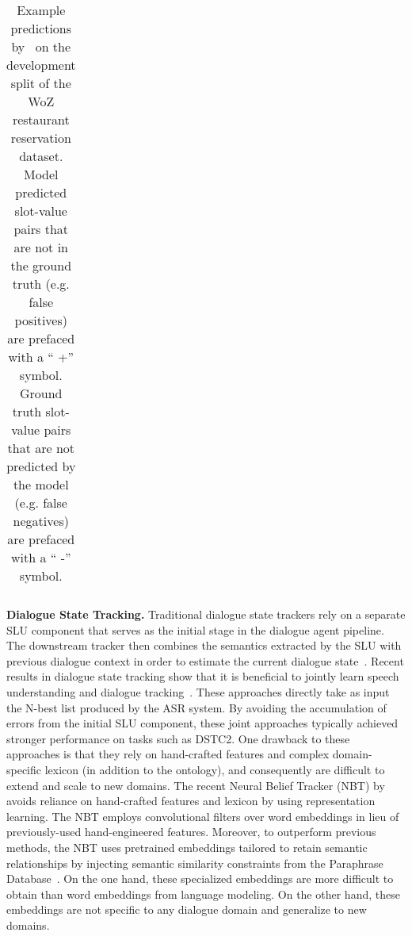 \documentclass[11pt,a4paper]{article}
\begin{document}
\begin{table*}[t]
\begin{tabular}{@{}p{6.5cm}p{4.3cm}l@{}}
\\ \bottomrule
\end{tabular}\caption{
Example predictions by \modelname~on the development split of the WoZ restaurant reservation dataset.
Model predicted slot-value pairs that are not in the ground truth (e.g. {\color{blue} false positives}) are prefaced with a ``{\color{blue} +}'' symbol.
Ground truth slot-value pairs that are not predicted by the model (e.g. {\color{red} false negatives}) are prefaced with a ``{\color{red} -}'' symbol.
}
\label{tb:preds}
\vspace{-0.3cm}
\end{table*}
 
\textbf{Dialogue State Tracking.}
Traditional dialogue state trackers rely on a separate SLU component that serves as the initial stage in the dialogue agent pipeline.
The downstream tracker then combines the semantics extracted by the SLU with previous dialogue context in order to estimate the current dialogue state~\cite{thomson2010bayesian,wang2013simple,williams2014web,perez2016dialog}.
Recent results in dialogue state tracking show that it is beneficial to jointly learn speech understanding and dialogue tracking~\cite{henderson2014word,zilka2015incremental,wen2017NetworkBasedEndToEndDialogueSystem}.
These approaches directly take as input the N-best list produced by the ASR system.
By avoiding the accumulation of errors from the initial SLU component, these joint approaches typically achieved stronger performance on tasks such as DSTC2.
One drawback to these approaches is that they rely on hand-crafted features and complex domain-specific lexicon (in addition to the ontology), and consequently are difficult to extend and scale to new domains.
The recent Neural Belief Tracker (NBT) by~\citet{mrkvsic2016neural} avoids reliance on hand-crafted features and lexicon by using representation learning.
The NBT employs convolutional filters over word embeddings in lieu of previously-used hand-engineered features.
Moreover, to outperform previous methods, the NBT uses pretrained embeddings tailored to retain semantic relationships by injecting semantic similarity constraints from the Paraphrase Database~\cite{wieting2015paraphrase,ganitkevitch2013ppdb}.
On the one hand, these specialized embeddings are more difficult to obtain than word embeddings from language modeling.
On the other hand, these embeddings are not specific to any dialogue domain and generalize to new domains.
\end{document}
